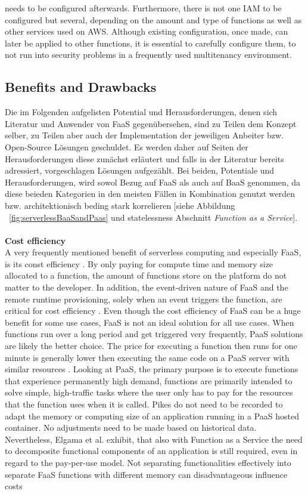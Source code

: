 \documentclass[a4paper,twoside,11pt, pagesize]{scrartcl}
\begin{document}
needs to be configured afterwards. Furthermore, there is not one IAM to be configured but several, depending on the amount and type of functions as well as other services used on AWS. Although existing configuration, once made, can later be applied to other functions, it is essential to carefully configure them, to not run into security problems in a frequently used multitenancy environment.
\subsection{Benefits and Drawbacks}
Die im Folgenden aufgelisten Potential und Herausforderungen, denen sich Literatur und Anwender von FaaS gegenübersehen, sind zu Teilen dem Konzept selber, zu Teilen aber auch der Implementation der jeweiligen Anbeiter bzw. Open-Source Lösungen geschuldet. Es werden daher auf Seiten der Herausforderungen diese zunächst erläutert und falls in der Literatur bereits adressiert, vorgeschlagen Lösungen aufgezählt. Bei beiden, Potentiale und Herausforderungen, wird sowol Bezug auf FaaS als auch auf BaaS genommen, da diese beieden Kategorien in den meisten Fällen in Kombination genutzt werden bzw. architektionisch beding stark korrelieren [siehe Abbildung ~\ref{fig:serverlessBaaSandPaas} und \glqq statelessness\grqq{} Abschnitt \textit{Function as a Service}].\\\\ \textbf{Cost efficiency}\\ A very frequently mentioned benefit of serverless computing and especially FaaS, is its const efficiency \cite{lee2018evaluation}. By only paying for compute time and memory size allocated to a function, the amount of functions store on the platform do not matter to the developer. In addition, the event-driven nature of FaaS and the remote runtime provisioning, solely when an event triggers the function, are critical for cost efficiency \cite{feng2018exploring}. Even though the cost efficiency of FaaS can be a huge benefit for some use cases, FaaS is not an ideal solution for all use cases. When functions run over a long period and get triggered very frequently, PaaS solutions are likely the better choice. The price for executing a function then runs for one minute is generally lower then executing the same code on a PaaS server with similar resources \cite{jonas2019cloud}. Looking at PaaS, the primary purpose is to execute functions that experience permanently high demand, functions are primarily intended to solve simple, high-traffic tasks where the user only has to pay for the resources that the function uses when it is called. Pikes do not need to be recorded to adapt the memory or computing size of an application running in a PaaS hosted container. No adjustments need to be made based on historical data. Nevertheless, Elgama et al. exhibit, that also with Function as a Service the need to decomposite functional components of an application is still required, even in regard to the pay-per-use model. Not separating functionalities effectively into separate FaaS functions with different memory can disadvantageous influence costs 
\end{document}
